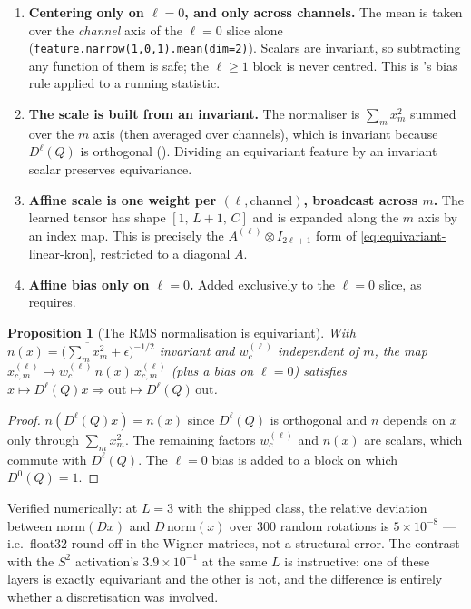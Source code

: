 \documentclass[11pt,a4paper]{report}
\newtheorem{proposition}[proposition]{Proposition}
\theoremstyle{definition}
\theoremstyle{remark}
\begin{document}
\begin{enumerate}
\item \textbf{Centering only on $\ell=0$, and only across channels.} The mean
is taken over the \emph{channel} axis of the $\ell=0$ slice alone
(\texttt{feature.narrow(1,0,1).mean(dim=2)}). Scalars are invariant, so
subtracting any function of them is safe; the $\ell\ge1$ block is never
centred. This is 's bias rule applied to a running
statistic.
\item \textbf{The scale is built from an invariant.} The normaliser is
$\sum_m x_m^2$ summed over the $m$ axis (then averaged over channels), which
is invariant because $D^\ell(Q)$ is orthogonal
(). Dividing an equivariant feature by an invariant
scalar preserves equivariance.
\item \textbf{Affine scale is one weight per $(\ell,\text{channel})$,
broadcast across $m$.} The learned tensor has shape
$[1,\,L+1,\,C]$ and is expanded along the $m$ axis by an index map. This is
precisely the $A^{(\ell)}\otimes I_{2\ell+1}$ form of
\eqref{eq:equivariant-linear-kron}, restricted to a diagonal $A$.
\item \textbf{Affine bias only on $\ell=0$.} Added exclusively to the
$\ell=0$ slice, as  requires.
\end{enumerate}

\begin{proposition}[The RMS normalisation is equivariant]
\label{prop:rmsnorm-equivariant}
With $n(x)=\bigl(\overline{\sum_m x_m^2}+\epsilon\bigr)^{-1/2}$ invariant and
$w^{(\ell)}_c$ independent of $m$, the map
$x^{(\ell)}_{c,m}\mapsto w^{(\ell)}_c\,n(x)\,x^{(\ell)}_{c,m}$ (plus a bias on
$\ell=0$) satisfies
$x\mapsto D^\ell(Q)x \Rightarrow \mathrm{out}\mapsto D^\ell(Q)\,\mathrm{out}$.
\end{proposition}

\begin{proof}
$n(D^\ell(Q)x)=n(x)$ since $D^\ell(Q)$ is orthogonal and $n$ depends on $x$
only through $\sum_m x_m^2$. The remaining factors $w^{(\ell)}_c$ and $n(x)$
are scalars, which commute with $D^\ell(Q)$. The $\ell=0$ bias is added to a
block on which $D^0(Q)=1$.
\end{proof}

Verified numerically: at $L=3$ with the shipped class, the relative deviation
between $\mathrm{norm}(D x)$ and $D\,\mathrm{norm}(x)$ over $300$ random
rotations is $5\times10^{-8}$ --- i.e.\ float32 round-off in the Wigner
matrices, not a structural error. The contrast with the $S^2$ activation's
$3.9\times10^{-1}$ at the same $L$ is instructive: one of these layers is
exactly equivariant and the other is not, and the difference is entirely
whether a discretisation was involved.
\end{document}
